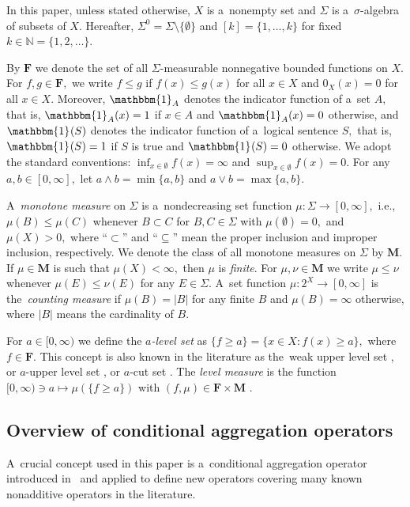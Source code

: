 \documentclass[preprint,11pt]{elsarticle}
\theoremstyle{definition}
\newcommand\mN{{\mathbb N}}
\newcommand\bF{\mathbf{F}} %
\newcommand\bM{\mathbf{M}} %
\renewcommand\ge{\geqslant}
\renewcommand\le{\leqslant}
\newcommand{\mI}[1]{\mathbbm{1}_{#1}}%
\newcommand{\tx}{\textstyle{}}
\begin{document}
In this paper, unless stated otherwise, $X$ is a~nonempty set and $\Sigma$ is a~$\sigma$-algebra of subsets of $X.$ Hereafter, $\Sigma^0=\Sigma\setminus \{\emptyset\}$ and  $[k]=\{1,\ldots,k\}$ for fixed $k\in\mN=\{1,2,\ldots\}.$

By $\bF$ we denote the set of all $\Sigma$-measurable nonnegative bounded functions on $X.$
For $f,g\in\bF,$ we write $f\le g$ if $f(x)\le g(x)$ for all $x\in X$ and $0_X(x)=0$ for all $x\in X.$
Moreover, $\mI{A}$ denotes the indicator function of a~set $A,$ that is, $\mI{A}(x)=1$ if $x\in A$ and $\mI{A}(x)=0$ otherwise, and $\mI{}(S)$ denotes the indicator function of a~logical sentence $S,$ that is, $\mI{}(S)=1$ if $S$ is true and $\mI{}(S)=0$ otherwise.
We adopt the standard conventions: $\tx{\inf_{x\in \emptyset} f(x)}=\infty$ and $\tx{\sup _{x\in \emptyset} f(x)=0}.$
For any $a,b\in [0,\infty],$ let $a\wedge b=\min\{a,b\}$ and $a\vee b=\max\{a,b\}.$


A~{\it monotone measure} on $\Sigma$  is a~nondecreasing set function $\mu\colon \Sigma\to [0,\infty],$ i.e., $\mu(B)\le\mu(C)$ whenever $B\subset C$ for $B,C\in\Sigma$ with $\mu(\emptyset)=0,$ and $\mu(X)>0,$
where ``$\subset$'' and ``$\subseteq$'' mean the proper inclusion and improper inclusion, respectively.
We denote the class of all monotone measures  on $\Sigma$  by $\bM.$ If $\mu\in \bM$ is such that $\mu(X)<\infty,$ then $\mu$ is \textit{finite}. For $\mu,\nu\in\bM$ we write $\mu\le \nu$ whenever $\mu(E)\le \nu(E)$ for any $E\in\Sigma.$ A~set function $\mu\colon 2^X \to [0,\infty]$  is the~\textit{counting measure} if $\mu(B)=|B|$ for any finite $B$ and $\mu(B)=\infty$ otherwise, where $|B|$ means the cardinality  of  $B.$


For $a\in [0,\infty)$ we define the \textit{$a$-level set} as $\{f\ge a\}=\{x\in X\colon f(x)\ge a\},$ where $f\in\bF.$ This concept is also known in the literature as the~weak upper level set \cite[Ch.~4]{denneberg00}, or $a$-upper level set \cite[p.~36]{durante-sempi}, or $a$-cut set  \cite[p.~15]{lee}.
The \textit{level measure} is  the function $[0,\infty)\ni a\mapsto \mu(\{f\ge a\})$ with $(f,\mu)\in\bF\times \bM$ \cite[Sec.\,2.2]{BHH4}.


\subsection{\textbf{Overview of conditional aggregation operators}}\label{sec:2.2}
A~crucial concept used in this paper is a~conditional aggregation operator introduced in~\cite{BHHK21} and applied to define new operators \cite{BHK22} covering many known nonadditive operators in the literature.
\end{document}
